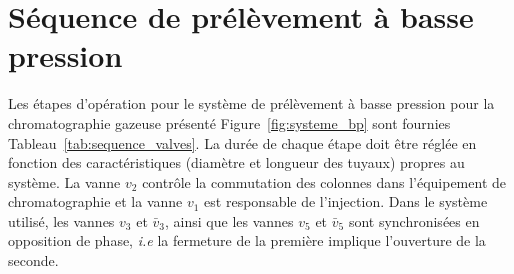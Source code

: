 \section*{Séquence de prélèvement à basse pression}

Les étapes d'opération pour le système de prélèvement à basse pression pour la chromatographie gazeuse présenté Figure~\ref{fig:systeme_bp} sont fournies Tableau~\ref{tab:sequence_valves}. La durée de chaque étape doit être réglée en fonction des caractéristiques (diamètre et longueur des tuyaux) propres au système. La vanne $v_2$ contrôle la commutation des colonnes dans l'équipement de chromatographie et la vanne $v_1$ est responsable de l'injection. Dans le système utilisé, les vannes $v_3$ et $\bar{v}_3$, ainsi que les vannes $v_5$ et $\bar{v}_5$ sont synchronisées en opposition de phase, \textit{i.e} la fermeture de la première implique l'ouverture de la seconde. 


